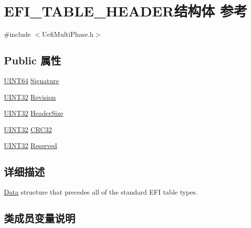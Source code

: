 \hypertarget{struct_e_f_i___t_a_b_l_e___h_e_a_d_e_r}{}\section{E\+F\+I\+\_\+\+T\+A\+B\+L\+E\+\_\+\+H\+E\+A\+D\+E\+R结构体 参考}
\label{struct_e_f_i___t_a_b_l_e___h_e_a_d_e_r}


{\ttfamily \#include $<$Uefi\+Multi\+Phase.\+h$>$}

\subsection*{Public 属性}
\begin{DoxyCompactItemize}
\item 
\hyperlink{_processor_bind_8h_a57be03562867144161c1bfee95ca8f7c}{U\+I\+N\+T64} \hyperlink{struct_e_f_i___t_a_b_l_e___h_e_a_d_e_r_ac64d8f731c5e181fea6e1f6d151f8eab}{Signature}
\item 
\hyperlink{_processor_bind_8h_ae1e6edbbc26d6fbc71a90190d0266018}{U\+I\+N\+T32} \hyperlink{struct_e_f_i___t_a_b_l_e___h_e_a_d_e_r_a81ed6a4813ad43b0e1252011b626829a}{Revision}
\item 
\hyperlink{_processor_bind_8h_ae1e6edbbc26d6fbc71a90190d0266018}{U\+I\+N\+T32} \hyperlink{struct_e_f_i___t_a_b_l_e___h_e_a_d_e_r_ab16fde8c7521836c272dc21fdc83d63f}{Header\+Size}
\item 
\hyperlink{_processor_bind_8h_ae1e6edbbc26d6fbc71a90190d0266018}{U\+I\+N\+T32} \hyperlink{struct_e_f_i___t_a_b_l_e___h_e_a_d_e_r_aec8d3c80619f3c0c4fd183c25f987e9a}{C\+R\+C32}
\item 
\hyperlink{_processor_bind_8h_ae1e6edbbc26d6fbc71a90190d0266018}{U\+I\+N\+T32} \hyperlink{struct_e_f_i___t_a_b_l_e___h_e_a_d_e_r_a6d8ed5bbbac04b13751ab12f4e338913}{Reserved}
\end{DoxyCompactItemize}


\subsection{详细描述}
\hyperlink{struct_data}{Data} structure that precedes all of the standard E\+FI table types. 

\subsection{类成员变量说明}
\mbox{\label{struct_e_f_i___t_a_b_l_e___h_e_a_d_e_r_aec8d3c80619f3c0c4fd183c25f987e9a}} 
